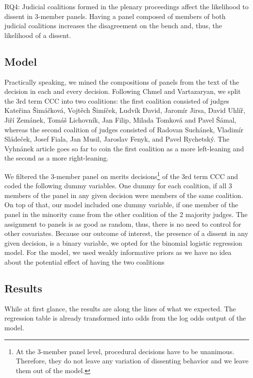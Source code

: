 \documentclass[
  11pt,
]{article}
\begin{document}
RQ4: Judicial coalitions formed in the plenary proceedings affect the
likelihood to dissent in 3-member panels. Having a panel composed of
members of both judicial coalitions increases the disagreement on the
bench and, thus, the likelihood of a dissent.

\hypertarget{model-2}{%
\subsection{Model}\label{model-2}}

Practically speaking, we mined the compositions of panels from the text
of the decision in each and every decision. Following Chmel and
Vartazaryan, we split the 3rd term CCC into two coalitions: the first
coalition consisted of judges Kateřina Šimáčková, Vojtěch Šimíček,
Ludvík David, Jaromír Jirsa, David Uhlíř, Jiří Zemánek, Tomáš Lichovník,
Jan Filip, Milada Tomková and Pavel Šámal, whereas the second coalition
of judges consisted of Radovan Suchánek, Vladimír Sládeček, Josef Fiala,
Jan Musil, Jaroslav Fenyk, and Pavel Rychetský. The Vyhnánek article
goes so far to coin the first coalition as a more left-leaning and the
second as a more right-leaning.

We filtered the 3-member panel on merits decisions\footnote{At the
  3-member panel level, procedural decisions have to be unanimous.
  Therefore, they do not leave any variation of dissenting behavior and
  we leave them out of the model.} of the 3rd term CCC and coded the
following dummy variables. One dummy for each coalition, if all 3
members of the panel in any given decision were members of the same
coalition. On top of that, our model included one dummy variable, if one
member of the panel in the minority came from the other coalition of the
2 majority judges. The assignment to panels is as good as random, thus,
there is no need to control for other covariates. Because our outcome of
interest, the presence of a dissent in any given decision, is a binary
variable, we opted for the binomial logistic regression model. For the
model, we used weakly informative priors as we have no idea about the
potential effect of having the two coalitions

\hypertarget{results}{%
\subsection{Results}\label{results}}

While at first glance, the results are along the lines of what we
expected. The regression table is already transformed into odds from the
log odds output of the model.
\end{document}
